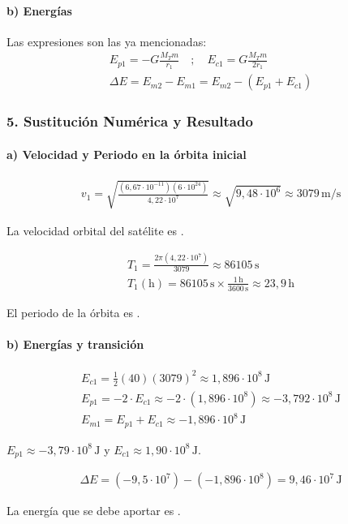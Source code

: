 \paragraph*{b) Energías}
Las expresiones son las ya mencionadas:
\begin{gather}
    E_{p1} = -G\frac{M_T m}{r_1} \quad ; \quad E_{c1} = G\frac{M_T m}{2r_1} \\
    \Delta E = E_{m2} - E_{m1} = E_{m2} - (E_{p1} + E_{c1})
\end{gather}

\subsubsection*{5. Sustitución Numérica y Resultado}
\paragraph*{a) Velocidad y Periodo en la órbita inicial}
\begin{gather}
    v_1 = \sqrt{\frac{(6,67\cdot10^{-11})(6\cdot10^{24})}{4,22\cdot10^7}} \approx \sqrt{9,48\cdot10^6} \approx 3079 \, \text{m/s}
\end{gather}
\begin{cajaresultado}
    La velocidad orbital del satélite es .
\end{cajaresultado}
\begin{gather}
    T_1 = \frac{2\pi (4,22\cdot10^7)}{3079} \approx 86105 \, \text{s} \\
    T_1 (\text{h}) = 86105 \, \text{s} \times \frac{1 \, \text{h}}{3600 \, \text{s}} \approx 23,9 \, \text{h}
\end{gather}
\begin{cajaresultado}
    El periodo de la órbita es .
\end{cajaresultado}

\paragraph*{b) Energías y transición}
\begin{gather}
    E_{c1} = \frac{1}{2}(40)(3079)^2 \approx 1,896 \cdot 10^8 \, \text{J} \\
    E_{p1} = -2 \cdot E_{c1} \approx -2 \cdot (1,896 \cdot 10^8) \approx -3,792 \cdot 10^8 \, \text{J} \\
    E_{m1} = E_{p1} + E_{c1} \approx -1,896 \cdot 10^8 \, \text{J}
\end{gather}
\begin{cajaresultado}
    $E_{p1} \approx -3,79 \cdot 10^8 \, \text{J}$ y $E_{c1} \approx 1,90 \cdot 10^8 \, \text{J}$.
\end{cajaresultado}
\begin{gather}
    \Delta E = (-9,5\cdot10^7) - (-1,896\cdot10^8) = 9,46 \cdot 10^7 \, \text{J}
\end{gather}
\begin{cajaresultado}
    La energía que se debe aportar es .
\end{cajaresultado}

